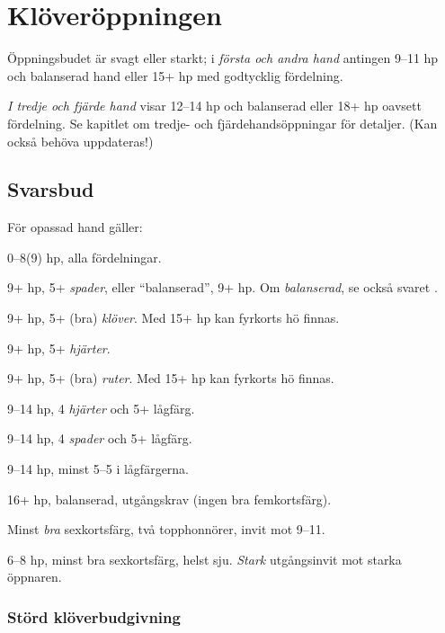 \chapter{Kl\"over\"oppningen}

\"Oppningsbudet  \"ar svagt eller starkt; i {\em f\"orsta och andra hand}
antingen 9--11 hp och balanserad hand eller 15+ hp med godtycklig f\"ordelning.

{\em I tredje och fj{\"a}rde hand}
 visar  12--14 hp och balanserad eller 18+ hp oavsett fördelning.
Se kapitlet om tredje- och fj\"ardehands\"oppningar f\"or detaljer. (Kan
också behöva uppdateras!)

\section{Svarsbud}

F{\"o}r opassad hand g{\"a}ller:

\bbe
   \item[--\ru{1}] 0--8(9) hp, alla fördelningar.

   \item[--\hj{1}] 9+ hp, 5+ \emph{spader}, eller ``balanserad'', 9+ hp. Om
     \emph{balanserad}, se också svaret .

   \item[--\spa{1}] 9+ hp, 5+ (bra) \emph{klöver}. Med 15+ hp kan fyrkorts hö
     finnas. 
   \item[--\NT{1}] 9+ hp, 5+ \emph{hjärter}.
   \item[--\kl{2}] 9+ hp, 5+ (bra) \emph{ruter}. Med 15+ hp kan fyrkorts hö finnas.
   \item[--\ru{2}] 9--14 hp, 4 \emph{hjärter} och 5+ lågfärg.
   \item[--\hj{2}] 9--14 hp, 4 \emph{spader} och 5+ lågfärg.
   \item[--\spa{2}] 9--14 hp, minst 5--5 i lågfärgerna.
   \item[--\NT{2}] 16+ hp, balanserad, utgångskrav (ingen bra femkortsfärg).
   \item[--\la{3}] Minst {\em bra} sexkortsf\"arg, två
     topphonnörer, invit mot 9--11.
   \item[--\ho{3}] 6--8 hp, minst bra sexkortsf\"arg, helst sju. {\em Stark}
                    utg{\aa}ngsinvit mot starka \"oppnaren.

\ebe

\subsection{St{\"o}rd kl{\"o}verbudgivning}

